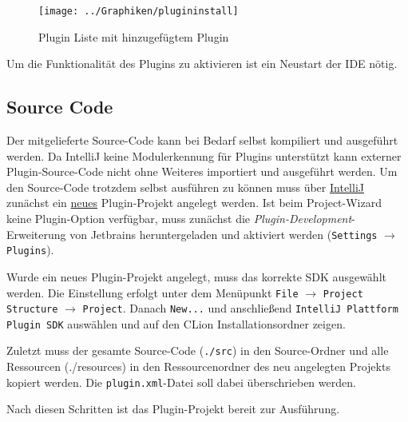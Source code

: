     \begin{figure}[h]
        \centering
        \caption{Plugin Liste mit hinzugefügtem Plugin}
        \label{fig:pluginlistinstall}
        \texttt{[image: ../Graphiken/plugininstall]}
    \end{figure}

    Um die Funktionalität des Plugins zu aktivieren ist ein Neustart der IDE nötig.

    \subsection{Source Code}
    Der mitgelieferte Source-Code kann bei Bedarf selbst kompiliert und ausgeführt werden.
    Da IntelliJ keine Modulerkennung für Plugins unterstützt kann externer Plugin-Source-Code nicht ohne Weiteres
    importiert und ausgeführt werden.
    Um den Source-Code trotzdem selbst ausführen zu können muss über
    \href{https://www.jetbrains.com/idea/}{IntelliJ} zunächst ein \underline{neues} Plugin-Projekt angelegt werden.
    Ist beim Project-Wizard keine Plugin-Option verfügbar, muss zunächst die \textit{Plugin-Development}-Erweiterung
    von Jetbrains heruntergeladen und aktiviert werden (\texttt{Settings} $\rightarrow$ \texttt{Plugins}).

    Wurde ein neues Plugin-Projekt angelegt, muss das korrekte SDK ausgewählt werden. Die Einstellung erfolgt unter
    dem Menüpunkt \texttt{File} $\rightarrow$ \texttt{Project Structure} $\rightarrow$ \texttt{Project}.
    Danach \texttt{New...} und anschließend \texttt{IntelliJ Plattform Plugin SDK} auswählen und auf den CLion
    Installationsordner zeigen.

    Zuletzt muss der gesamte Source-Code (\texttt{./src}) in den Source-Ordner und alle Ressourcen (./resources) in
    den Ressourcenordner des neu angelegten Projekts kopiert werden. Die \texttt{plugin.xml}-Datei soll dabei
    überschrieben werden.

    Nach diesen Schritten ist das Plugin-Projekt bereit zur Ausführung.